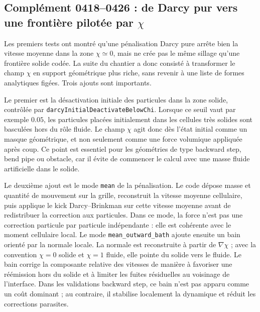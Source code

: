 \documentclass[11pt,a4paper]{article}
\begin{document}
\subsection{Complément 0418--0426 : de Darcy pur vers une frontière pilotée par \texorpdfstring{$\chi$}{chi}}

Les premiers tests ont montré qu'une pénalisation Darcy pure arrête bien la vitesse moyenne dans la zone $\chi\simeq0$, mais ne crée pas le même sillage qu'une frontière solide codée. La suite du chantier a donc consisté à transformer le champ $\chi$ en support géométrique plus riche, sans revenir à une liste de formes analytiques figées. Trois ajouts sont importants.

Le premier est la désactivation initiale des particules dans la zone solide, contrôlée par \texttt{darcyInitialDeactivateBelowChi}. Lorsque ce seuil vaut par exemple $0.05$, les particules placées initialement dans les cellules très solides sont basculées hors du rôle fluide. Le champ $\chi$ agit donc dès l'état initial comme un masque géométrique, et non seulement comme une force volumique appliquée après coup. Ce point est essentiel pour les géométries de type backward step, bend pipe ou obstacle, car il évite de commencer le calcul avec une masse fluide artificielle dans le solide.

Le deuxième ajout est le mode \texttt{mean} de la pénalisation. Le code dépose masse et quantité de mouvement sur la grille, reconstruit la vitesse moyenne cellulaire, puis applique le kick Darcy--Brinkman sur cette vitesse moyenne avant de redistribuer la correction aux particules. Dans ce mode, la force n'est pas une correction particule par particule indépendante : elle est cohérente avec le moment cellulaire local. Le mode \texttt{mean\_outward\_bath} ajoute ensuite un bain orienté par la normale locale. La normale est reconstruite à partir de $\nabla\chi$ ; avec la convention $\chi=0$ solide et $\chi=1$ fluide, elle pointe du solide vers le fluide. Le bain corrige la composante relative des vitesses de manière à favoriser une réémission hors du solide et à limiter les fuites résiduelles au voisinage de l'interface. Dans les validations backward step, ce bain n'est pas apparu comme un coût dominant ; au contraire, il stabilise localement la dynamique et réduit les corrections parasites.
\end{document}
